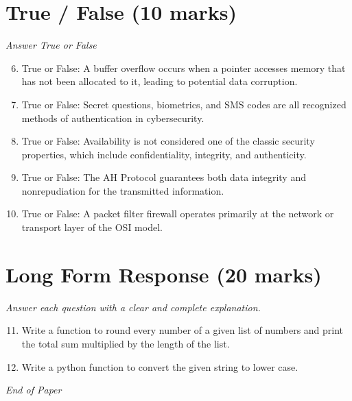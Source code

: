 \documentclass[12pt]{article}
\begin{document}
\section*{True / False (10 marks)}
\textit{Answer True or False}
\begin{enumerate}[label=\arabic*.]
\setcounter{enumi}{5}
\item True or False: A buffer overflow occurs when a pointer accesses memory that has not been allocated to it, leading to potential data corruption.
\item True or False: Secret questions, biometrics, and SMS codes are all recognized methods of authentication in cybersecurity.
\item True or False: Availability is not considered one of the classic security properties, which include confidentiality, integrity, and authenticity.
\item True or False: The AH Protocol guarantees both data integrity and nonrepudiation for the transmitted information.
\item True or False: A packet filter firewall operates primarily at the network or transport layer of the OSI model.
\end{enumerate}

\section*{Long Form Response (20 marks)}
\textit{Answer each question with a clear and complete explanation.}
\begin{enumerate}[label=\arabic*.]
\setcounter{enumi}{10}
\item Write a function to round every number of a given list of numbers and print the total sum multiplied by the length of the list.
\item Write a python function to convert the given string to lower case.
\end{enumerate}

\vfill
\noindent\textit{End of Paper}
\end{document}
